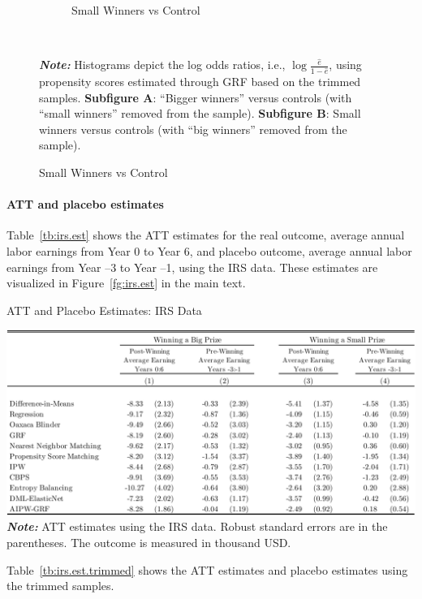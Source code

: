 \documentclass[letterpaper,12pt,leqno]{article}
\begin{document}
\begin{figure}[!ht]
\begin{minipage}[c]{.8\linewidth}
\begin{subfigure}{0.45\linewidth}
            \caption{Small Winners vs Control}
        \end{subfigure}
    \end{minipage}%
    \\\raggedright
     {\footnotesize\textbf{\textit{Note:}} Histograms depict the log odds ratios, i.e., $\log\frac{\hat{e}}{1-\hat{e}}$, using propensity scores estimated through GRF based on the trimmed samples. \textbf{Subfigure A}: ``Bigger winners'' versus controls (with ``small winners'' removed from the sample). \textbf{Subfigure B}: Small winners versus controls (with ``big winners'' removed from the sample).}
\end{figure}

\FloatBarrier
\clearpage

\paragraph{ATT and placebo estimates} Table~\ref{tb:irs.est} shows the ATT estimates for the real outcome, average annual labor earnings from Year 0 to Year 6, and placebo outcome, average annual labor earnings from Year –3 to Year –1, using the IRS data. These estimates are visualized in Figure~\ref{fg:irs.est} in the main text. 

\begin{table}[!ht]
\caption{ATT and Placebo Estimates: IRS Data}\label{tb:irs.est.trimmed}
\begin{minipage}[c]{1\textwidth}
\vspace{-0.5em}\includegraphics[width=\linewidth]{irs.pdf}
{\footnotesize\textbf{\textit{Note:}} ATT estimates using the IRS data. Robust standard errors are in the parentheses. The outcome is measured in thousand USD.}
\end{minipage}%
\end{table}
\clearpage


\noindent Table~\ref{tb:irs.est.trimmed} shows the ATT estimates and placebo estimates using the trimmed samples. 
\end{document}
